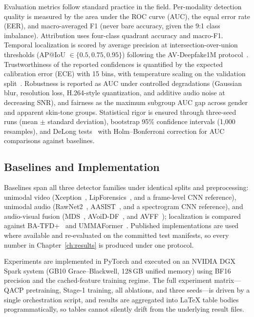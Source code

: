 Evaluation metrics follow standard practice in the field. Per-modality
detection quality is measured by the area under the ROC curve (AUC), the
equal error rate (EER), and macro-averaged F1 (never bare accuracy, given
the 9:1 class imbalance). Attribution uses four-class quadrant accuracy and
macro-F1. Temporal localization is scored by average precision at
intersection-over-union thresholds (AP@IoU $\in \{0.5, 0.75, 0.95\}$)
following the AV-Deepfake1M protocol~\cite{cai2023avdeepfake1m}.
Trustworthiness of the reported confidences is quantified by the expected
calibration error (ECE) with 15 bins, with temperature scaling on the
validation split~\cite{guo2017calibration}. Robustness is reported as AUC
under controlled degradations (Gaussian blur, resolution loss, H.264-style
quantization, and additive audio noise at decreasing SNR), and fairness as
the maximum subgroup AUC gap across gender and apparent skin-tone groups.
Statistical rigor is ensured through three-seed runs (mean $\pm$ standard
deviation), bootstrap 95\% confidence intervals (1{,}000 resamples), and
DeLong tests~\cite{delong1988} with Holm--Bonferroni correction for AUC
comparisons against baselines.

\subsection{Baselines and Implementation}
Baselines span all three detector families under identical splits and
preprocessing: unimodal video (Xception~\cite{rossler2019faceforensics},
LipForensics~\cite{haliassos2021lipforensics}, and a frame-level CNN
reference), unimodal audio (RawNet2~\cite{tak2021rawnet2},
AASIST~\cite{jung2022aasist}, and a spectrogram CNN reference), and
audio-visual fusion (MDS~\cite{chugh2020mds}, AVoiD-DF~\cite{yang2023avoiddf},
and AVFF~\cite{oorloff2024avff}); localization is compared against
BA-TFD+~\cite{cai2023batfdplus} and UMMAFormer~\cite{zhang2023ummaformer}.
Published implementations are used where available and re-evaluated on the
committed test manifests, so every number in Chapter~\ref{ch:results} is
produced under one protocol.

Experiments are implemented in PyTorch and executed on an NVIDIA DGX Spark
system (GB10 Grace--Blackwell, 128\,GB unified memory) using BF16 precision
and the cached-feature training regime. The full experiment matrix---QACP
pretraining, Stage-1 training, all ablations, and three seeds---is driven by
a single orchestration script, and results are aggregated into LaTeX table
bodies programmatically, so tables cannot silently drift from the underlying
result files.

